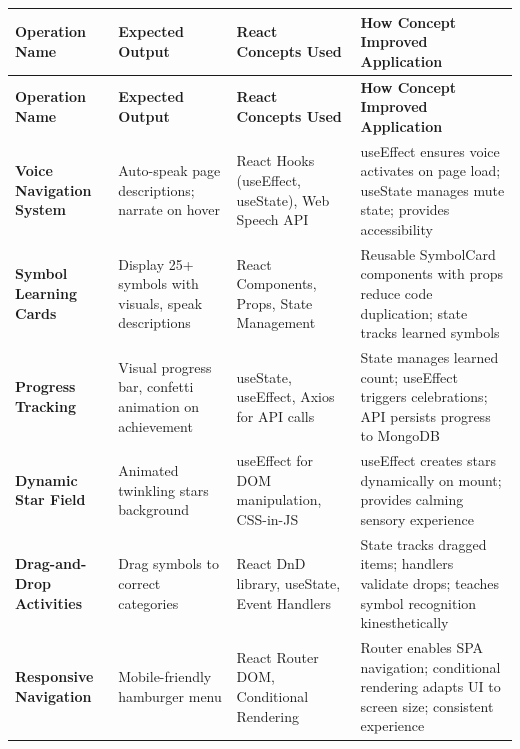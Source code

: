 \documentclass[12pt, a4paper]{article}
\begin{document}
\begin{longtable}{|>{\raggedright}p{3cm}|>{\raggedright}p{3.5cm}|>{\raggedright}p{3.5cm}|>{\raggedright\arraybackslash}p{4cm}|}
\hline
\rowcolor{electricblue!30}
\textbf{Operation Name} & \textbf{Expected Output} & \textbf{React Concepts Used} & \textbf{How Concept Improved Application} \\
\hline
\endfirsthead

\hline
\rowcolor{electricblue!30}
\textbf{Operation Name} & \textbf{Expected Output} & \textbf{React Concepts Used} & \textbf{How Concept Improved Application} \\
\hline
\endhead

\hline
\endfoot

\textbf{Voice Navigation System} & Auto-speak page descriptions; narrate on hover & React Hooks (useEffect, useState), Web Speech API & useEffect ensures voice activates on page load; useState manages mute state; provides accessibility \\
\hline

\textbf{Symbol Learning Cards} & Display 25+ symbols with visuals, speak descriptions & React Components, Props, State Management & Reusable SymbolCard components with props reduce code duplication; state tracks learned symbols \\
\hline

\textbf{Progress Tracking} & Visual progress bar, confetti animation on achievement & useState, useEffect, Axios for API calls & State manages learned count; useEffect triggers celebrations; API persists progress to MongoDB \\
\hline

\textbf{Dynamic Star Field} & Animated twinkling stars background & useEffect for DOM manipulation, CSS-in-JS & useEffect creates stars dynamically on mount; provides calming sensory experience \\
\hline

\textbf{Drag-and-Drop Activities} & Drag symbols to correct categories & React DnD library, useState, Event Handlers & State tracks dragged items; handlers validate drops; teaches symbol recognition kinesthetically \\
\hline

\textbf{Responsive Navigation} & Mobile-friendly hamburger menu & React Router DOM, Conditional Rendering & Router enables SPA navigation; conditional rendering adapts UI to screen size; consistent experience \\
\hline


\end{longtable}
\end{document}
